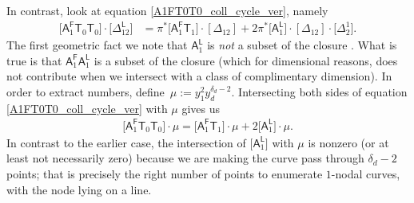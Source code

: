 \documentclass[11pt]{article}
\numberwithin{equation}{section}
\begin{document}
In contrast, look at equation \eqref{A1FT0T0_coll_cycle_ver}, namely
\begin{align*}
\bigl[\mathsf{A}_1^{\mathsf{F}}\mathsf{T}_0 \mathsf{T}_0\bigr] \cdot \bigl[\Delta^{\mathsf{L}}_{12}\bigr] &  =  \pi^*\bigl[\mathsf{A}_1^{\mathsf{F}}\mathsf{T}_1\bigr]\cdot [\Delta_{12}] + 2\pi^*\bigl[\mathsf{A}_1^{\mathsf{L}}\bigr]\cdot [\Delta_{12}]\cdot
\bigl[\Delta_{2}^1\bigr].
\end{align*}
The first geometric fact we note that $\mathsf{A}_1^{\mathsf{L}}$ is \emph{not} a subset of the
closure .
What is true is that $\mathsf{A}_1^{\mathsf{F}}\mathsf{A}_1^{\mathsf{L}}$
is a subset of the closure (which for dimensional reasons, does not contribute when
we intersect with a class of complimentary dimension). In order to extract
numbers, define~$\mu := y_1^2 y_d^{\delta_d-2}$.
Intersecting both sides of equation \eqref{A1FT0T0_coll_cycle_ver}
with $\mu$ gives us
\begin{align*}
\bigl[\mathsf{A}_1^{\mathsf{F}}\mathsf{T}_0 \mathsf{T}_0\bigr] \cdot \mu  =
\bigl[\mathsf{A}_1^{\mathsf{F}}\mathsf{T}_1\bigr]\cdot \mu + 2 \bigl[\mathsf{A}_1^{\mathsf{L}}\bigr]\cdot \mu.
\end{align*}
In contrast to the earlier case, the intersection of
$\bigl[\mathsf{A}_1^{\mathsf{L}}\bigr]$ with $\mu$ is nonzero (or at least not necessarily zero)
because we are making the curve pass through $\delta_d-2$ points; that is precisely the right number
of points to enumerate $1$-nodal curves, with the node lying on a line.
\end{document}
